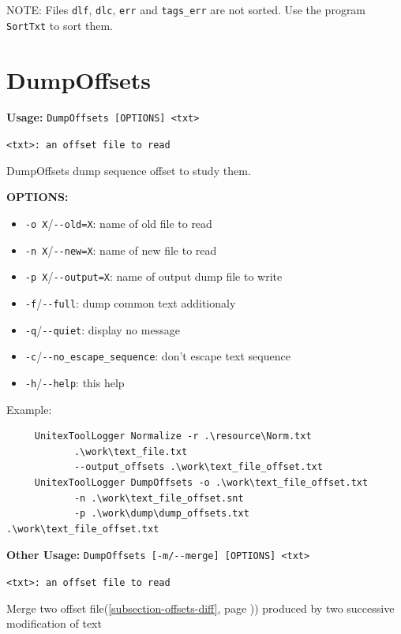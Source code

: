 \bigskip
\noindent NOTE: Files \verb+dlf+, \verb+dlc+, \verb+err+ and \verb+tags_err+ are not sorted. Use the
program \verb+SortTxt+ to sort them.



\section{DumpOffsets}
\label{section-DumpOffsets}
\textbf{Usage:} \verb+DumpOffsets [OPTIONS] <txt>+

\bigskip
\noindent\verb+<txt>: an offset file to read+

\bigskip
\noindent DumpOffsets dump sequence offset to study them.

\bigskip
\noindent \textbf{OPTIONS:}

\begin{itemize} 	 
  \item \verb+-o X+/\verb+--old=X+: name of old file to read 	 
  \item \verb+-n X+/\verb+--new=X+: name of new file to read 	 
  \item \verb+-p X+/\verb+--output=X+: name of output dump file to write 	 
  \item \verb+-f+/\verb+--full+: dump common text additionaly
  \item \verb+-q+/\verb+--quiet+: display no message 	 
  \item \verb+-c+/\verb+--no_escape_sequence+: don't escape text sequence 	 
  \item \verb+-h+/\verb+--help+: this help 	 
\end{itemize}

\noindent Example: 
\begin{verbatim}
	 UnitexToolLogger Normalize -r .\resource\Norm.txt
	        .\work\text_file.txt 	 
	        --output_offsets .\work\text_file_offset.txt 	 
	 UnitexToolLogger DumpOffsets -o .\work\text_file_offset.txt
	        -n .\work\text_file_offset.snt 	 
	        -p .\work\dump\dump_offsets.txt .\work\text_file_offset.txt 	 
\end{verbatim}

\bigskip
\noindent \textbf{Other Usage:} \verb+DumpOffsets [-m/--merge] [OPTIONS] <txt>+

\bigskip
\noindent \verb+<txt>: an offset file to read+

\bigskip
\noindent Merge two offset file(\ref{subsection-offsets-diff}, page \pageref{subsection-offsets-diff})) produced by two successive modification of text 

